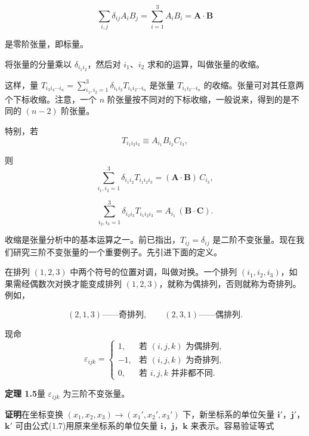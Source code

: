 \documentclass[11pt,a4paper,oneside]{ctexbook}
\newcommand{\ve}[1]{\bm{#1}}
\begin{document}
\begin{equation*}
\sum_{i,j} \delta_{ij} A_i B_j = \sum_{i=1}^{3} A_i B_i = \ve{A} \cdot \ve{B}
\end{equation*}

是零阶张量，即标量。

将张量的分量乘以 $\delta_{i_1 i_2}$，然后对 $i_1$、$i_2$ 求和的运算，叫做张量的收缩。

这样，量 $T_{i_3 i_4 \cdots i_n} = \sum_{i_1, i_2 = 1}^{3} \delta_{i_1 i_2} T_{i_1 i_2 \cdots i_n}$ 是张量 $T_{i_1 i_2 \cdots i_n}$ 的收缩。张量可对其任意两个下标收缩。注意，一个 $n$ 阶张量按不同对的下标收缩，一般说来，得到的是不同的 $(n - 2)$ 阶张量。

特别，若
\begin{equation*}
T_{i_1 i_2 i_3} \equiv A_{i_1} B_{i_2} C_{i_3},
\end{equation*}

则
\begin{equation*}
\sum_{i_1, i_2 = 1}^{3} \delta_{i_1 i_2} T_{i_1 i_2 i_3} = (\ve{A} \cdot \ve{B})\, C_{i_3},
\end{equation*}

\begin{equation*}
\sum_{i_2, i_3 = 1}^{3} \delta_{i_2 i_3} T_{i_1 i_2 i_3} = A_{i_1}\, (\ve{B} \cdot \ve{C}).
\end{equation*}

收缩是张量分析中的基本运算之一。前已指出，$T_{ij} = \delta_{ij}$ 是二阶不变张量。现在我们研究三阶不变张量的一个重要例子。先引进下面的定义。

在排列 $(1, 2, 3)$ 中两个符号的位置对调，叫做对换。一个排列 $(i_1, i_2, i_3)$，如果需经偶数次对换才能变成排列 $(1, 2, 3)$，就称为偶排列，否则就称为奇排列。例如，

\[
(2, 1, 3) \text{——奇排列}, \qquad (2, 3, 1) \text{——偶排列}.
\]

现命
\begin{equation*}
\varepsilon_{ijk} =
\begin{cases}
1,  & \text{若 } (i, j, k) \text{ 为偶排列},\\
-1, & \text{若 } (i, j, k) \text{ 为奇排列},\\
0,  & \text{若 } i, j, k \text{ 并非都不同}.
\end{cases}
\end{equation*}

\textbf{定理 1.5}\quad 量 $\varepsilon_{ijk}$ 为三阶不变张量。

\textbf{证明}\quad 在坐标变换 $(x_1, x_2, x_3) \longrightarrow (x_1', x_2', x_3')$ 下，新坐标系的单位矢量 $\ve{i}'$，$\ve{j}'$，$\ve{k}'$ 可由公式(1.7)用原来坐标系的单位矢量 $\ve{i}$，$\ve{j}$，$\ve{k}$ 来表示。容易验证等式
\end{document}

